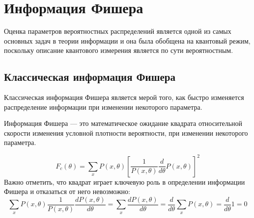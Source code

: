 \section{Информация Фишера}

Оценка параметров вероятностных распределений является одной из самых основных задач в теории информации
и она была обобщена на квантовый режим\cite{Helstrom1976, Holevo1982}, поскольку описание квантового измерения является по сути вероятностным.

\subsection{Классическая информация Фишера}
Классическая информация Фишера является мерой того,
как быстро изменяется распределение информации при изменении некоторого параметра.

\begin{definition}\label{def:fisher-information}
 Информация Фишера --- это математическое ожидание квадрата относительной скорости изменения условной плотности вероятности,
 при изменении некоторого параметра.
\end{definition}
%
\begin{equation}\label{eq:fisher-information}
  F_c({\theta})=
      \sum_x{{P}(x,\theta)}
          \left[\frac{1}{P(x,\theta)}
     \frac{d}{d\theta}
  {P(x,\theta)}\right]^2
\end{equation}
%
Важно отметить,
что квадрат играет ключевую роль в определении информации Фишера
и отказаться от него невозможно:
%
\begin{equation}
    \label{eq:2}
        \sum_x{{P}(x,\theta)}
            \frac{1}{P(x,\theta)}
                \frac{dP(x,\theta)}{d\theta} =
                    \sum_x\frac{{dP}(x,\theta)}{d\theta} =
                \frac{d}{d\theta}\sum_x{{P}(x,\theta)} =
            \frac{d}{d\theta}1 =
            0
\end{equation}

